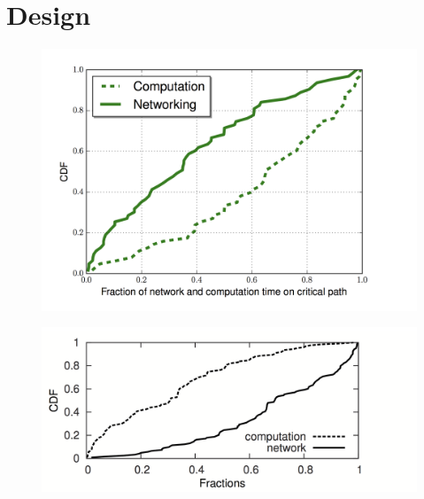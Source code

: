 \section{Design}
\label{sec:design}

\begin{figure}[t]
\centering
\includegraphics[width=0.9\columnwidth]{figs/comp_net.png}
\label{fig:mobile-runtime}
\end{figure}

\begin{figure}[t]
\centering
\includegraphics[width=0.9\columnwidth]{figs/comp_net_desk.png}
\label{fig:mobile-runtime}
\end{figure}


